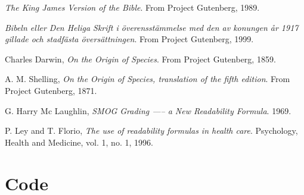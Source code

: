 \documentclass[a4paper]{article}
\begin{document}
\begin{thebibliography}{99}
  \emph{The King James Version of the Bible}.
  From Project Gutenberg,
  1989.

  \emph{Bibeln eller Den Heliga Skrift i överensstämmelse med den av
konungen år 1917 gillade och stadfästa översättningen}.
  From Project Gutenberg,
  1999.

  Charles Darwin,
  \emph{On the Origin of Species}.
  From Project Gutenberg,
  1859.

  A. M. Shelling,
  \emph{On the Origin of Species, translation of the fifth edition}.
  From Project Gutenberg,
  1871.

  G. Harry Mc Laughlin,
  \emph{SMOG Grading —– a New Readability Formula}.
  1969.
 
  P. Ley and T. Florio,
  \emph{The use of readability formulas in health care}.
  Psychology, Health and Medicine, vol. 1, no. 1,
  1996.

\end{thebibliography}

\newpage
\appendix
\section{Code}
\end{document}
